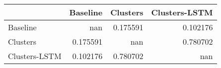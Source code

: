 \begin{tabular}{lrrr}
\toprule
               &   Baseline &   Clusters &   Clusters-LSTM \\
\midrule
 Baseline      & nan        &   0.175591 &        0.102176 \\
 Clusters      &   0.175591 & nan        &        0.780702 \\
 Clusters-LSTM &   0.102176 &   0.780702 &      nan        \\
\bottomrule
\end{tabular}